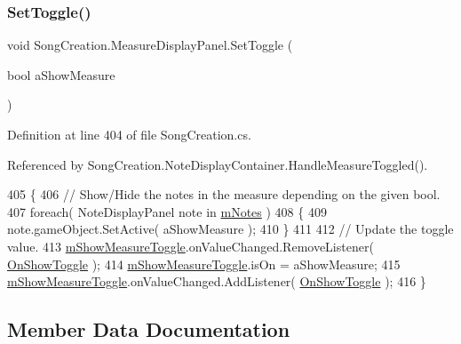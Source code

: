 \subsubsection{\texorpdfstring{Set\+Toggle()}{SetToggle()}}
{\footnotesize\ttfamily void Song\+Creation.\+Measure\+Display\+Panel.\+Set\+Toggle (\begin{DoxyParamCaption}\item[{bool}]{a\+Show\+Measure }\end{DoxyParamCaption})}



Definition at line 404 of file Song\+Creation.\+cs.



Referenced by Song\+Creation.\+Note\+Display\+Container.\+Handle\+Measure\+Toggled().


\begin{DoxyCode}
405         \{
406             \textcolor{comment}{// Show/Hide the notes in the measure depending on the given bool.}
407             \textcolor{keywordflow}{foreach}( NoteDisplayPanel note \textcolor{keywordflow}{in} \hyperlink{class_song_creation_1_1_measure_display_panel_a096dfc8481f3defcdcb57bfc140ac953}{mNotes} )
408             \{
409                 note.gameObject.SetActive( aShowMeasure );
410             \}
411 
412             \textcolor{comment}{// Update the toggle value.}
413             \hyperlink{class_song_creation_1_1_measure_display_panel_abe01653518d60c345faa462ccf979a55}{mShowMeasureToggle}.onValueChanged.RemoveListener( 
      \hyperlink{class_song_creation_1_1_measure_display_panel_a0ade5469a803bafc5a87595d0a2fef88}{OnShowToggle} );
414             \hyperlink{class_song_creation_1_1_measure_display_panel_abe01653518d60c345faa462ccf979a55}{mShowMeasureToggle}.isOn = aShowMeasure;
415             \hyperlink{class_song_creation_1_1_measure_display_panel_abe01653518d60c345faa462ccf979a55}{mShowMeasureToggle}.onValueChanged.AddListener( 
      \hyperlink{class_song_creation_1_1_measure_display_panel_a0ade5469a803bafc5a87595d0a2fef88}{OnShowToggle} );
416         \}
\end{DoxyCode}


\subsection{Member Data Documentation}
\mbox{\label{class_song_creation_1_1_measure_display_panel_a3794bf2a605eaa0595e6c6e41f5b458c}} 
